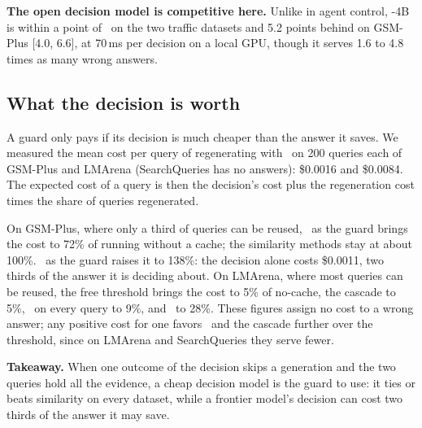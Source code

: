 \textbf{The open decision model is competitive here.}
Unlike in agent control, \kev-4B is within a point of \jev\ on the two traffic datasets and 5.2 points behind on GSM-Plus [4.0, 6.6], at 70\,ms per decision on a local GPU, though it serves 1.6 to 4.8 times as many wrong answers.

\subsection{What the decision is worth}

A guard only pays if its decision is much cheaper than the answer it saves.
We measured the mean cost per query of regenerating with \gbig\ on 200 queries each of GSM-Plus and LMArena (SearchQueries has no answers): \$0.0016 and \$0.0084.
The expected cost of a query is then the decision's cost plus the regeneration cost times the share of queries regenerated.

On GSM-Plus, where only a third of queries can be reused, \jev\ as the guard brings the cost to 72\% of running without a cache; the similarity methods stay at about 100\%.
\gbig\ as the guard raises it to 138\%: the decision alone costs \$0.0011, two thirds of the answer it is deciding about.
On LMArena, where most queries can be reused, the free threshold brings the cost to 5\% of no-cache, the cascade to 5\%, \jev\ on every query to 9\%, and \gbig\ to 28\%.
These figures assign no cost to a wrong answer; any positive cost for one favors \jev\ and the cascade further over the threshold, since on LMArena and SearchQueries they serve fewer.

\textbf{Takeaway.} When one outcome of the decision skips a generation and the two queries hold all the evidence, a cheap decision model is the guard to use: it ties or beats similarity on every dataset, while a frontier model's decision can cost two thirds of the answer it may save.
